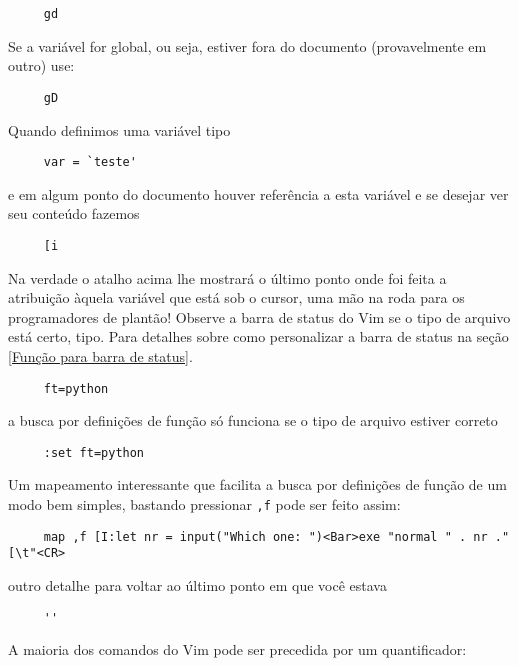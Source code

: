 \begin{verbatim}
     gd
\end{verbatim}

Se a variável for global, ou seja, estiver fora do documento
(provavelmente em outro) use:

\begin{verbatim}
     gD
\end{verbatim}

Quando definimos uma variável tipo

\begin{verbatim}
     var = `teste'
\end{verbatim}

e em algum ponto do documento houver referência a esta variável e se
desejar ver seu conteúdo fazemos

\begin{verbatim}
     [i
\end{verbatim}

Na verdade o atalho acima lhe mostrará o último ponto onde foi feita a
atribuição àquela variável que está sob o cursor, uma mão na roda para os
programadores de plantão!  {\Large {}} Observe a  barra de status do
Vim se o tipo de arquivo está certo, tipo. Para detalhes sobre como
personalizar a barra de status na seção \ref{Função para barra de status}.

\begin{verbatim}
     ft=python
\end{verbatim}

a busca por definições de função só funciona se o tipo de arquivo
estiver correto

\begin{verbatim}
     :set ft=python
\end{verbatim}

{\Large {}} Um mapeamento interessante que facilita a busca por definições
de função de um modo bem simples, bastando pressionar \verb|,f| pode ser feito assim:

\begin{verbatim}
     map ,f [I:let nr = input("Which one: ")<Bar>exe "normal " . nr ."[\t"<CR>
\end{verbatim}


outro detalhe para voltar ao último ponto em que você estava

\begin{verbatim}
     ''
\end{verbatim}

A maioria dos comandos do Vim pode ser precedida por um quantificador:

